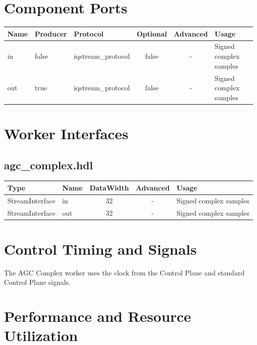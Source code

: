 \documentclass{article}
\def\comp{agc\_complex}
\def\Comp{AGC Complex}
\begin{document}
\begin{landscape}
	\section*{Component Ports}
	\begin{scriptsize}
		\begin{tabular}{|M{2cm}|M{1.5cm}|M{4cm}|c|c|M{9cm}|}
			\hline
			Name & Producer & Protocol           & Optional & Advanced & Usage                  \\
			\hline
			in   & false    & iqstream\_protocol & false    & -        & Signed complex samples \\
			\hline
			out  & true     & iqstream\_protocol & false    & -        & Signed complex samples \\
			\hline
		\end{tabular}
	\end{scriptsize}

	\section*{Worker Interfaces}
	\subsection*{\comp.hdl}
	\begin{scriptsize}
		\begin{tabular}{|M{2cm}|M{1.5cm}|c|c|M{12cm}|}
			\hline
			\rowcolor{blue}
			Type            & Name & DataWidth & Advanced & Usage                  \\
			\hline
			StreamInterface & in   & 32        & -        & Signed complex samples \\
			\hline
			StreamInterface & out  & 32        & -        & Signed complex samples \\
			\hline
		\end{tabular}
	\end{scriptsize}
\end{landscape}

\section*{Control Timing and Signals}
\begin{flushleft}
	The {\Comp} worker uses the clock from the Control Plane and standard Control Plane signals.
\end{flushleft}

\section*{Performance and Resource Utilization}
\end{document}
